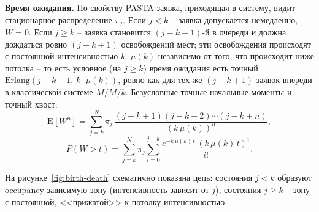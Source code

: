 \documentclass[12pt,a4paper]{article}
\begin{document}
\noindent\textbf{Время ожидания.} По свойству PASTA заявка, приходящая в систему, видит стационарное распределение $\pi_j$. Если $j<k$ -- заявка допускается немедленно, $W=0$. Если $j\ge k$ -- заявка становится $(j-k+1)$-й в очереди и должна дождаться ровно $(j-k+1)$ освобождений мест; эти освобождения происходят с постоянной интенсивностью $k\cdot\mu(k)$ независимо от того, что происходит ниже потолка -- то есть условное (на $j\ge k$) время ожидания есть точный $\mathrm{Erlang}(j-k+1,\,k\cdot\mu(k))$, ровно как для тех же $(j-k+1)$ заявок впереди в классической системе $M/M/k$. Безусловные точные начальные моменты и точный хвост:
\begin{equation}
\mathrm{E}[W^n] = \sum_{j=k}^{N}\pi_j\,\frac{(j-k+1)(j-k+2)\cdots(j-k+n)}{(k\,\mu(k))^n},
\label{eq:w-moments}
\end{equation}
\begin{equation}
P(W>t) = \sum_{j=k}^{N}\pi_j\sum_{i=0}^{j-k}\frac{e^{-k\,\mu(k)\,t}\,(k\,\mu(k)\,t)^i}{i!}.
\label{eq:w-tail}
\end{equation}

На рисунке~\ref{fig:birth-death} схематично показана цепь: состояния $j<k$ образуют occupancy-зависимую зону (интенсивность зависит от $j$), состояния $j\ge k$ -- зону с постоянной, <<прижатой>> к потолку интенсивностью.
\end{document}

